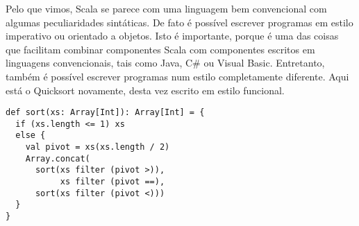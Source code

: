 %
Pelo que vimos, Scala se parece com uma linguagem bem convencional 
com algumas peculiaridades sint\'{a}ticas. De fato \'{e} poss\'{i}vel escrever
programas em estilo imperativo ou orientado a objetos. Isto \'{e} 
importante, porque \'{e} uma das coisas que facilitam combinar componentes
Scala com componentes escritos em linguagens convencionais, tais como Java,
C\# ou Visual Basic.
Entretanto, tamb\'{e}m \'{e} poss\'{i}vel escrever programas num estilo completamente
diferente. Aqui est\'{a} o Quicksort novamente, desta vez escrito em 
estilo funcional.
\begin{lstlisting}
def sort(xs: Array[Int]): Array[Int] = {
  if (xs.length <= 1) xs
  else {
    val pivot = xs(xs.length / 2)
    Array.concat(
      sort(xs filter (pivot >)),
           xs filter (pivot ==),
      sort(xs filter (pivot <)))
  }
}
\end{lstlisting}
